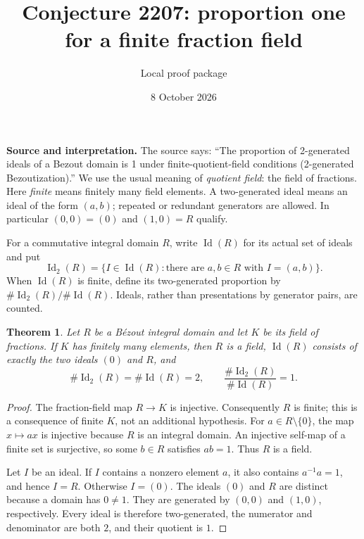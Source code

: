 \documentclass[11pt]{article}
\title{Conjecture 2207: proportion one\protect\\for a finite fraction field}
\author{Local proof package}
\date{8 October 2026}
\newtheorem{theorem}{Theorem}
\newcommand{\Id}{\operatorname{Id}}
\begin{document}
\maketitle
\noindent\textbf{Source and interpretation.}
The source says: ``The proportion of 2-generated ideals of a Bezout domain is 1
under finite-quotient-field conditions (2-generated Bezoutization).''
We use the usual meaning of \emph{quotient field}: the field of fractions.
Here \emph{finite} means finitely many field elements. A two-generated ideal
means an ideal of the form $(a,b)$; repeated or redundant generators are allowed.
In particular $(0,0)=(0)$ and $(1,0)=R$ qualify.

\medskip
\noindent For a commutative integral domain $R$, write $\Id(R)$ for its actual
set of ideals and put
\[
 \Id_2(R)=\{I\in\Id(R):\text{there are }a,b\in R\text{ with }I=(a,b)\}.
\]
When $\Id(R)$ is finite, define its two-generated proportion by
$\#\Id_2(R)/\#\Id(R)$. Ideals, rather than presentations by generator pairs,
are counted.

\begin{theorem}
Let $R$ be a B\'ezout integral domain and let $K$ be its field of fractions.
If $K$ has finitely many elements, then $R$ is a field, $\Id(R)$ consists
of exactly the two ideals $(0)$ and $R$, and
\[
 \#\Id_2(R)=\#\Id(R)=2,\qquad
 \frac{\#\Id_2(R)}{\#\Id(R)}=1.
\]
\end{theorem}

\begin{proof}
The fraction-field map $R\longrightarrow K$ is injective. Consequently $R$
is finite; this is a consequence of finite $K$, not an additional hypothesis.
For $a\in R\setminus\{0\}$, the map $x\mapsto ax$ is injective because $R$
is an integral domain. An injective self-map of a finite set is surjective,
so some $b\in R$ satisfies $ab=1$. Thus $R$ is a field.

Let $I$ be an ideal. If $I$ contains a nonzero element $a$, it also contains
$a^{-1}a=1$, and hence $I=R$. Otherwise $I=(0)$. The ideals $(0)$ and $R$
are distinct because a domain has $0\ne1$. They are generated by $(0,0)$
and $(1,0)$, respectively. Every ideal is therefore two-generated, the
numerator and denominator are both $2$, and their quotient is $1$.
\end{proof}

\newpage
\end{document}
